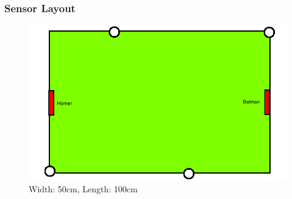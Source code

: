 \documentclass{beamer}
\begin{document}
\begin{frame}\frametitle{Sensor Layout}
\begin{figure}
\centering
\includegraphics[scale=0.3]{layoutPic}
\caption{Width: 50cm, Length: 100cm}
\end{figure}
\end{frame}
\end{document}
